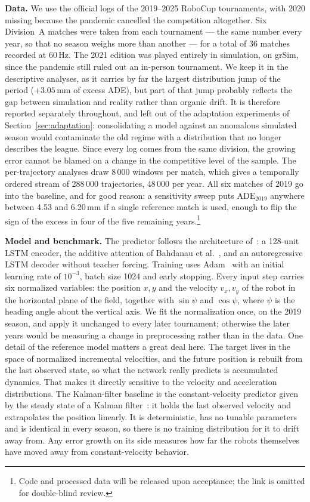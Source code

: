 \documentclass[conference]{IEEEtran}
\begin{document}
\textbf{Data.}
We use the official logs of the 2019--2025 RoboCup tournaments, with 2020
missing because the pandemic cancelled the competition altogether. Six
Division~A matches were taken from each tournament --- the same number every
year, so that no season weighs more than another --- for a total of 36 matches
recorded at 60\,Hz. The 2021 edition was played entirely in simulation, on
grSim, since the pandemic still ruled out an in-person tournament. We keep it in
the descriptive analyses, as it carries by far the largest distribution jump of
the period ($+3.05$\,mm of excess ADE), but part of that jump probably reflects
the gap between simulation and reality rather than organic drift. It is
therefore reported separately throughout, and left out of the adaptation
experiments of Section~\ref{sec:adaptation}: consolidating a model against an
anomalous simulated season would contaminate the old regime with a distribution
that no longer describes the league. Since every log comes from the same
division, the growing error cannot be blamed on a change in the competitive
level of the sample. The per-trajectory analyses draw 8\,000 windows per match,
which gives a temporally ordered stream of 288\,000 trajectories, 48\,000 per
year. All six matches of 2019 go into the baseline, and for good reason: a
sensitivity sweep puts $\mathrm{ADE}_{2019}$ anywhere between 4.53 and
6.20\,mm if a single reference match is used, enough to flip the sign of the
excess in four of the five remaining years.\footnote{Code and
processed data will be released upon acceptance; the link is omitted for
double-blind review.}

\textbf{Model and benchmark.}
The predictor follows the architecture of~\cite{seq2seq}: a 128-unit LSTM
encoder, the additive attention of Bahdanau et al.~\cite{bahdanau}, and an
autoregressive LSTM decoder without teacher forcing. Training uses
Adam~\cite{adam} with an initial learning rate of $10^{-3}$, batch size 1024
and early stopping. Every input step carries six normalized variables: the
position $x,y$ and the velocity $v_x,v_y$ of the robot in the horizontal plane
of the field, together with $\sin\psi$ and $\cos\psi$, where $\psi$ is the
heading angle about the vertical axis. We fit the normalization once, on the
2019 season, and apply it unchanged to every later tournament; otherwise the
later years would be measuring a change in preprocessing rather than in the
data. One detail of the reference model matters a great deal here. The target
lives in the space of normalized incremental velocities, and the future
position is rebuilt from the last observed state, so what the network really
predicts is accumulated dynamics. That makes it directly sensitive to the
velocity and acceleration distributions. The Kalman-filter baseline is the
constant-velocity predictor given by the steady state of a Kalman
filter~\cite{kalman}: it holds the last observed velocity and extrapolates the
position linearly. It is deterministic, has no tunable parameters and is
identical in every season, so there is no training distribution for it to drift
away from. Any error growth on its side measures how far the robots themselves
have moved away from constant-velocity behavior.
\end{document}
